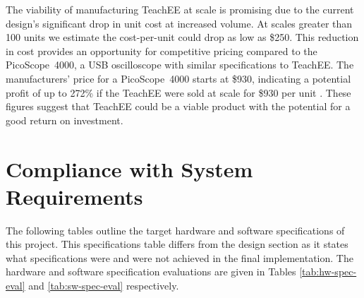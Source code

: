 \documentclass[letterpaper,11pt]{article}
\begin{document}


The viability of manufacturing TeachEE at scale is promising due to the current
design's significant drop in unit cost at increased volume.  At scales greater
than 100 units we estimate the cost-per-unit could drop as low as \$250. This
reduction in cost provides an opportunity for competitive pricing compared to
the PicoScope\textregistered~4000, a USB oscilloscope with similar
specifications to TeachEE. The manufacturers' price for a
PicoScope\textregistered~4000 starts at \$930, indicating a potential profit of
up to 272\% if the TeachEE were sold at scale for \$930 per unit
\cite{picoscope}. These figures suggest that TeachEE could be a viable product with
the potential for a good return on investment.

\section{Compliance with System Requirements} %

The following tables outline the target hardware and software specifications of
this project. This specifications table differs from the design section as it
states what specifications were and were not achieved in the final
implementation. The hardware and software specification evaluations are given in
Tables \ref{tab:hw-spec-eval} and \ref{tab:sw-spec-eval} respectively.
\end{document}

